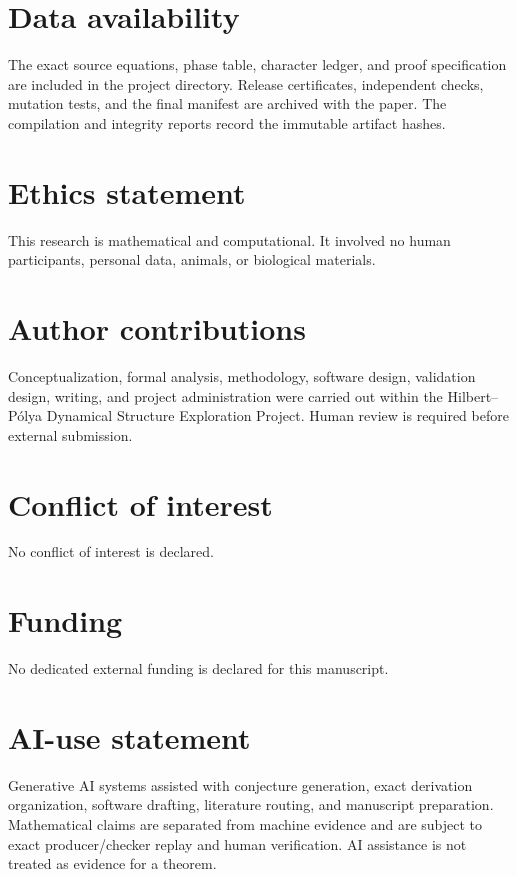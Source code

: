 \section*{Data availability}

The exact source equations, phase table, character ledger, and proof
specification are included in the project directory.  Release
certificates, independent checks, mutation tests, and the final manifest
are archived with the paper.  The compilation and integrity reports record
the immutable artifact hashes.

\section*{Ethics statement}

This research is mathematical and computational.  It involved no human
participants, personal data, animals, or biological materials.

\section*{Author contributions}

Conceptualization, formal analysis, methodology, software design,
validation design, writing, and project administration were carried out
within the Hilbert--P\'olya Dynamical Structure Exploration Project.
Human review is required before external submission.

\section*{Conflict of interest}

No conflict of interest is declared.

\section*{Funding}

No dedicated external funding is declared for this manuscript.

\section*{AI-use statement}

Generative AI systems assisted with conjecture generation, exact
derivation organization, software drafting, literature routing, and
manuscript preparation.  Mathematical claims are separated from
machine evidence and are subject to exact producer/checker replay and
human verification.  AI assistance is not treated as evidence for a
theorem.

